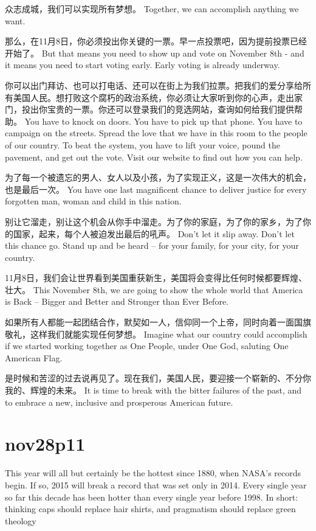\documentclass[UTF8]{ctexart}
\begin{document}
众志成城，我们可以实现所有梦想。
Together, we can accomplish anything we want.

那么，在11月8日，你必须投出你关键的一票。早一点投票吧，因为提前投票已经开始了。
But that means you need to show up and vote on November 8th - and it means you need to start voting early. Early voting is already underway.

你可以出门拜访、也可以打电话、还可以在街上为我们拉票。把我们的爱分享给所有美国人民。想打败这个腐朽的政治系统，你必须让大家听到你的心声，走出家门，投出你宝贵的一票。你还可以登录我们的竞选网站，查询如何给我们提供帮助。
You have to knock on doors. You have to pick up that phone. You have to campaign on the streets. Spread the love that we have in this room to the people of our country. To beat the system, you have to lift your voice, pound the pavement, and get out the vote. Visit our website to find out how you can help.

为了每一个被遗忘的男人、女人以及小孩，为了实现正义，这是一次伟大的机会，也是最后一次。
You have one last magnificent chance to deliver justice for every forgotten man, woman and child in this nation.

别让它溜走，别让这个机会从你手中溜走。为了你的家庭，为了你的家乡，为了你的国家，起来，每个人被迫发出最后的吼声。
Don’t let it slip away. Don’t let this chance go. Stand up and be heard – for your family, for your city, for your country.

11月8日，我们会让世界看到美国重获新生，美国将会变得比任何时候都要辉煌、壮大。
This November 8th, we are going to show the whole world that America is Back – Bigger and Better and Stronger than Ever Before.

如果所有人都能一起团结合作，默契如一人，信仰同一个上帝，同时向着一面国旗敬礼，这样我们就能实现任何梦想。
Imagine what our country could accomplish if we started working together as One People, under One God, saluting One American Flag.

是时候和苦涩的过去说再见了。现在我们，美国人民，要迎接一个崭新的、不分你我的、辉煌的未来。
It is time to break with the bitter failures of the past, and to embrace a new, inclusive and prosperous American future.

\section{nov28p11}
This year will all but certainly be the hottest since 1880, when NASA’s records begin. If so, 2015 will break a record that was set only in 2014. Every single year so far this decade has been hotter than every single year before 1998. In short: thinking caps should replace hair shirts, and pragmatism should replace green theology
\end{document}
